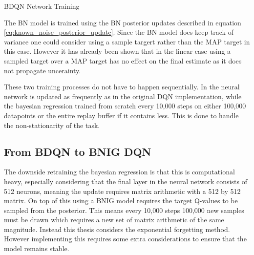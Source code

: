 \begin{algorithm}[H] 
    \caption{BDQN Network Training} 
    \label{alg:BDQN_train} 
\end{algorithm}

The BN model is trained using the BN posterior updates described in equation \ref{eq:known_noise_posterior_update}. Since the BN model does keep track of variance one could consider using a sample targert rather than the MAP target in this case. However it has already been shown that in the linear case using a sampled target over a MAP target has no effect on the final estimate as it does not propagate uncerainty.

These two training processes do not have to happen sequentially. In \cite{azziz_2018} the neural network is updated as frequently as in the original DQN implementation, while the bayesian regression trained from scratch every 10,000 steps on either 100,000 datapoints or the entire replay buffer if it contains less. This is done to handle the non-stationarity of the task. 

\subsection{From BDQN to BNIG DQN}

The downside retraining the bayesian regression is that this is computational heavy, especially considering that the final layer in the neural network consists of 512 neurons, meaning the update requires matrix arithmetic with a 512 by 512 matrix. On top of this using a BNIG model requires the target Q-values to be sampled from the posterior. This means every 10,000 steps 100,000 new samples must be drawn which requires a new set of matrix arithmetic of the same magnitude. Instead this thesis considers the exponential forgetting method. However implementing this requires some extra considerations to ensure that the model remains stable.

